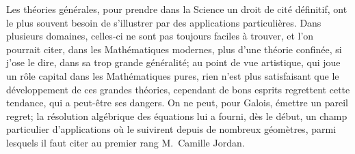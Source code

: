 \documentclass[leqno,12pt]{book}[2005/09/16]
\begin{document}
Les théories générales, pour prendre dans la Science un
droit de cité définitif, ont le plus souvent besoin de s'illustrer
par des applications particulières. Dans plusieurs domaines,
celles-ci ne sont pas toujours faciles à trouver, et l'on pourrait
citer, dans les Mathématiques modernes, plus d'une théorie
confinée, si j'ose le dire, dans sa trop grande généralité;
au point de vue artistique, qui joue un rôle capital dans les
Mathématiques pures, rien n'est plus satisfaisant que le développement
de ces grandes théories, cependant de bons
esprits regrettent cette tendance, qui a peut-être ses dangers.
On ne peut, pour Galois, émettre un pareil regret; la résolution
algébrique des équations lui a fourni, dès le début, un
champ particulier d'applications où le suivirent depuis de
nombreux géomètres, parmi lesquels il faut citer au premier
rang M.~Camille Jordan.
\end{document}
